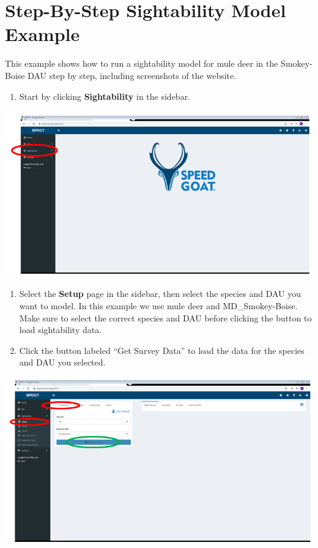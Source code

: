 \documentclass[
]{book}
\providecommand{\tightlist}{%
  \setlength{\itemsep}{0pt}\setlength{\parskip}{0pt}}
\begin{document}
\hypertarget{sight-ex}{%
\section{Step-By-Step Sightability Model Example}\label{sight-ex}}

This example shows how to run a sightability model for mule deer in the Smokey-Boise DAU step by step, including screenshots of the website.

\begin{enumerate}
\def\labelenumi{\arabic{enumi}.}
\tightlist
\item
  Start by clicking \textbf{Sightability} in the sidebar.
\end{enumerate}

\includegraphics{./www/sight_01.PNG}

\begin{enumerate}
\def\labelenumi{\arabic{enumi}.}
\setcounter{enumi}{1}
\item
  Select the \textbf{Setup} page in the sidebar, then select the species and DAU you want to model. In this example we use mule deer and MD\_Smokey-Boise. Make sure to select the correct species and DAU before clicking the button to load sightability data.
\item
  Click the button labeled ``Get Survey Data'' to load the data for the species and DAU you selected.
\end{enumerate}

\includegraphics{./www/sight_02.PNG}
\end{document}
